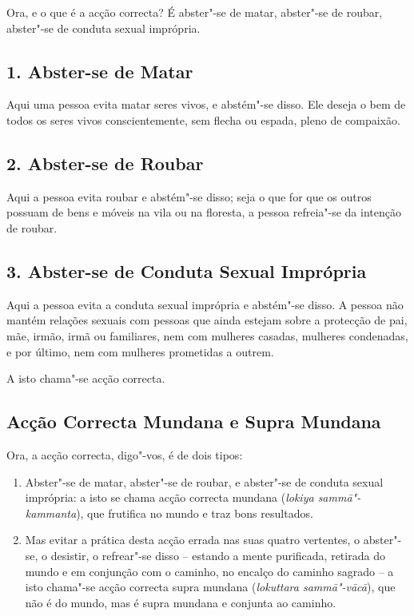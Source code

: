 

Ora, e o que é a acção correcta? É abster"-se de matar, abster"-se de roubar,
abster"-se de conduta sexual imprópria.


\subsection{1. Abster-se de Matar}

Aqui uma pessoa evita matar seres vivos, e abstém"-se disso. Ele deseja o bem de
todos os seres vivos conscientemente, sem flecha ou espada, pleno de compaixão.

\subsection{2. Abster-se de Roubar}

Aqui a pessoa evita roubar e abstém"-se disso; seja o que for que os outros
possuam de bens e móveis na vila ou na floresta, a pessoa refreia"-se da intenção
de roubar.

\subsection{3. Abster-se de Conduta Sexual Imprópria}

Aqui a pessoa evita a conduta sexual imprópria e abstém"-se disso. A pessoa não
mantém relações sexuais com pessoas que ainda estejam sobre a protecção de pai,
mãe, irmão, irmã ou familiares, nem com mulheres casadas, mulheres condenadas, e
por último, nem com mulheres prometidas a outrem.

A isto chama"-se acção correcta.


\subsection{Acção Correcta Mundana e Supra Mundana}

Ora, a acção correcta, digo"-vos, é de dois tipos:

\begin{enumerate}

  \item Abster"-se de matar, abster"-se de roubar, e abster"-se de conduta sexual
        imprópria: a isto se chama acção correcta mundana (\emph{lokiya
        sammā"-kammanta}), que frutifica no mundo e traz bons resultados.

  \item Mas evitar a prática desta acção errada nas suas quatro vertentes, o
        abster"-se, o desistir, o refrear"-se disso -- estando a mente purificada,
        retirada do mundo e em conjunção com o caminho, no encalço do caminho
        sagrado -- a isto chama"-se acção correcta supra mundana (\emph{lokuttara
        sammā"-vācā}), que não é do mundo, mas é supra mundana e conjunta ao
        caminho.

\end{enumerate}

